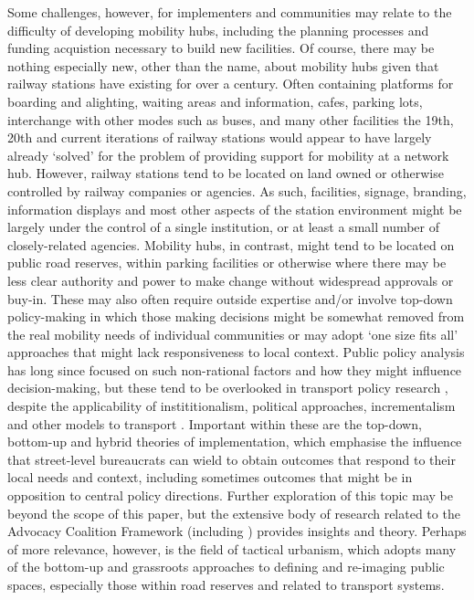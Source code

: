 \documentclass[preprint, 3p,
authoryear]{elsarticle} %
\begin{document}
Some challenges, however, for implementers and communities may relate to
the difficulty of developing mobility hubs, including the planning
processes and funding acquistion necessary to build new facilities. Of
course, there may be nothing especially new, other than the name, about
mobility hubs given that railway stations have existing for over a
century. Often containing platforms for boarding and alighting, waiting
areas and information, cafes, parking lots, interchange with other modes
such as buses, and many other facilities the 19th, 20th and current
iterations of railway stations would appear to have largely already
`solved' for the problem of providing support for mobility at a network
hub. However, railway stations tend to be located on land owned or
otherwise controlled by railway companies or agencies. As such,
facilities, signage, branding, information displays and most other
aspects of the station environment might be largely under the control of
a single institution, or at least a small number of closely-related
agencies. Mobility hubs, in contrast, might tend to be located on public
road reserves, within parking facilities or otherwise where there may be
less clear authority and power to make change without widespread
approvals or buy-in. These may also often require outside expertise
and/or involve top-down policy-making in which those making decisions
might be somewhat removed from the real mobility needs of individual
communities or may adopt `one size fits all' approaches that might lack
responsiveness to local context. Public policy analysis has long since
focused on such non-rational factors and how they might influence
decision-making, but these tend to be overlooked in transport policy
research \cite{Marsden:2017aa}, despite the applicability of
instititionalism, political approaches, incrementalism and other models
to transport \cite{Reynolds:2017ah}. Important within these are the
top-down, bottom-up and hybrid theories of implementation, which
emphasise the influence that street-level bureaucrats can wield to
obtain outcomes that respond to their local needs and context, including
sometimes outcomes that might be in opposition to central policy
directions. Further exploration of this topic may be beyond the scope of
this paper, but the extensive body of research related to the Advocacy
Coalition Framework (including
\cite{Sabatier:1986aa,Sabatier:1987aa,Sabatier:1988aa,Sabatier:1993aa,Weible:2009aa,Weible:2007aa})
provides insights and theory. Perhaps of more relevance, however, is the
field of tactical urbanism, which adopts many of the bottom-up and
grassroots approaches to defining and re-imaging public spaces,
especially those within road reserves and related to transport systems.
\end{document}
